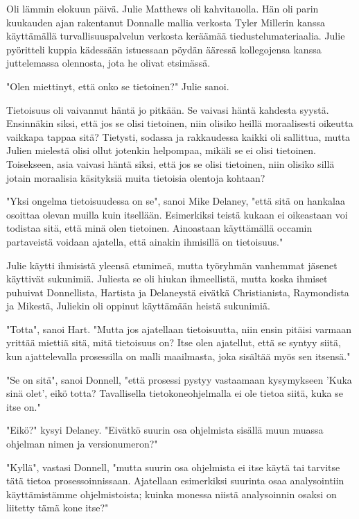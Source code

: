 \psep Oli lämmin elokuun päivä. Julie Matthews oli kahvitauolla. Hän oli parin kuukauden ajan rakentanut Donnalle mallia verkosta Tyler Millerin kanssa käyttämällä turvallisuuspalvelun verkosta keräämää tiedustelumateriaalia. Julie pyöritteli kuppia kädessään istuessaan pöydän ääressä kollegojensa kanssa juttelemassa olennosta, jota he olivat etsimässä.


"Olen miettinyt, että onko se tietoinen?" Julie sanoi.


Tietoisuus oli vaivannut häntä jo pitkään. Se vaivasi häntä kahdesta syystä. Ensinnäkin siksi, että jos se olisi tietoinen, niin olisiko heillä moraalisesti oikeutta vaikkapa tappaa sitä? Tietysti, sodassa ja rakkaudessa kaikki oli sallittua, mutta Julien mielestä olisi ollut jotenkin helpompaa, mikäli se ei olisi tietoinen. Toisekseen, asia vaivasi häntä siksi, että jos se olisi tietoinen, niin olisiko sillä jotain moraalisia käsityksiä muita tietoisia olentoja kohtaan?


"Yksi ongelma tietoisuudessa on se", sanoi Mike Delaney, "että sitä on hankalaa osoittaa olevan muilla kuin itsellään. Esimerkiksi teistä kukaan ei oikeastaan voi todistaa sitä, että minä olen tietoinen. Ainoastaan käyttämällä occamin partaveistä voidaan ajatella, että ainakin ihmisillä on tietoisuus."


Julie käytti ihmisistä yleensä etunimeä, mutta työryhmän vanhemmat jäsenet käyttivät sukunimiä. Juliesta se oli hiukan ihmeellistä, mutta koska ihmiset puhuivat Donnellista, Hartista ja Delaneystä eivätkä Christianista, Raymondista ja Mikestä, Juliekin oli oppinut käyttämään heistä sukunimiä.


"Totta", sanoi Hart. "Mutta jos ajatellaan tietoisuutta, niin ensin pitäisi varmaan yrittää miettiä sitä, mitä tietoisuus on? Itse olen ajatellut, että se syntyy siitä, kun ajattelevalla prosessilla on malli maailmasta, joka sisältää myös sen itsensä."


"Se on sitä", sanoi Donnell, "että prosessi pystyy vastaamaan kysymykseen 'Kuka sinä olet', eikö totta? Tavallisella tietokoneohjelmalla ei ole tietoa siitä, kuka se itse on."


"Eikö?" kysyi Delaney. "Eivätkö suurin osa ohjelmista sisällä muun muassa ohjelman nimen ja versionumeron?"


"Kyllä", vastasi Donnell, "mutta suurin osa ohjelmista ei itse käytä tai tarvitse tätä tietoa prosessoinnissaan. Ajatellaan esimerkiksi suurinta osaa analysointiin käyttämistämme ohjelmistoista; kuinka monessa niistä analysoinnin osaksi on liitetty tämä kone itse?"


